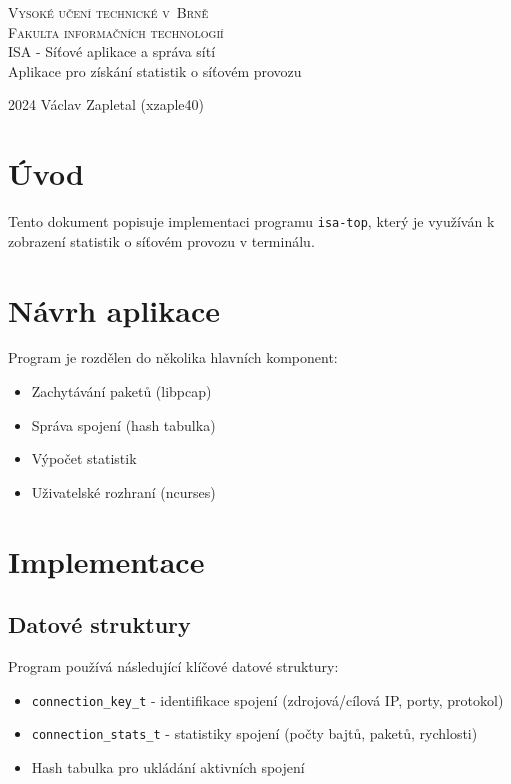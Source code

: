 \documentclass[a4paper,11pt]{article}
\theoremstyle{definition}
\begin{document}
\begin{titlepage}
    \begin{center}
        \Huge
        \textsc{Vysoké učení technické v~Brně\\
        \huge Fakulta informačních technologií}\\
        \LARGE ISA - Síťové aplikace a správa sítí\\
        Aplikace pro získání statistik o síťovém provozu
    \end{center}
    {\Large 2024 \hfill Václav Zapletal (xzaple40)}
\end{titlepage}

\tableofcontents
\newpage

\section{Úvod}
Tento dokument popisuje implementaci programu \texttt{isa-top}, který je využíván k zobrazení statistik o síťovém provozu v terminálu.


\section{Návrh aplikace}
Program je rozdělen do několika hlavních komponent:
\begin{itemize}
    \item Zachytávání paketů (libpcap)
    \item Správa spojení (hash tabulka)
    \item Výpočet statistik
    \item Uživatelské rozhraní (ncurses)
\end{itemize}

\section{Implementace}
\subsection{Datové struktury}
Program používá následující klíčové datové struktury:
\begin{itemize}
    \item \texttt{connection\_key\_t} - identifikace spojení (zdrojová/cílová IP, porty, protokol)
    \item \texttt{connection\_stats\_t} - statistiky spojení (počty bajtů, paketů, rychlosti)
    \item Hash tabulka pro ukládání aktivních spojení
\end{itemize}
\end{document}
